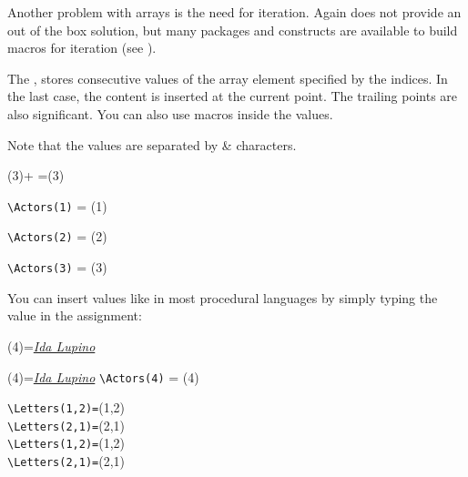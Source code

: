 Another problem with arrays is the need for iteration. Again \alltex does not provide an out of the box solution, but many packages and constructs are available to build macros for iteration (see \cite{repeat}).


\begin{teX}
\newarray\Actors
\newarray\Dates
\newarray\Sexes
\end{teX}

The , stores consecutive values of the  array element specified by the indices. In the last case, the content is inserted at the current point. The trailing points are also significant. You can also use \latex macros inside the values.

\newarray\Actors
{}

\begin{teX}
\newarray\Actors
{}
\end{teX}

Note that the values are separated by \& characters.

\newarray\Values
{}

\Values(3)+ =\Values(3)

\newarray\Actors

\verb+\Actors(1)+ = \Actors(1)

\verb+\Actors(2)+ = \Actors(2)

\verb+\Actors(3)+ = \Actors(3)

You can insert values like in most procedural languages by simply typing the value in the assignment:

\begin{teX}
\Actors(4)={\textit{\underline{Ida Lupino}}}
\end{teX}

\Actors(4)={\textit{\underline{Ida Lupino}}}
\verb+\Actors(4)+ = \Actors(4)



\newarray\Letters

 \verb+\Letters(1,2)=+\Letters(1,2)\\
 \verb+\Letters(2,1)=+\Letters(2,1)\\
 \normalindextrue
 \verb+\Letters(1,2)=+\Letters(1,2)\\
 \verb+\Letters(2,1)=+\Letters(2,1)\\



